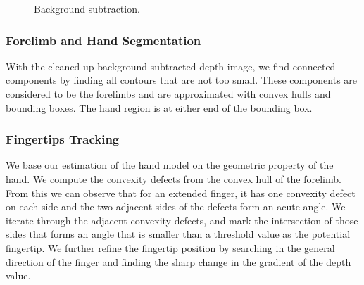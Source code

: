 \begin{figure}[h]
  \centering
  \caption{Background subtraction.} \label{fig:setup}
\end{figure}


\subsubsection{Forelimb and Hand Segmentation}
With the cleaned up background subtracted depth image, we find connected
components by finding all contours that are not too small. These components are
considered to be the forelimbs and are approximated with convex hulls and 
bounding boxes. The hand region is at either end of the bounding box.

\subsubsection{Fingertips Tracking}
We base our estimation of the hand model on the geometric property of the
hand. We compute the convexity defects from the convex hull of the forelimb.
From this we can observe that for an extended finger, it has one convexity
defect on each side and the two adjacent sides of the defects form an
acute angle. We iterate through the adjacent convexity defects, and mark the
intersection of those sides that forms an angle that is smaller than a threshold
value as the potential fingertip. We further refine the fingertip position by
searching in the general direction of the finger and finding the sharp change in
the gradient of the depth value.



